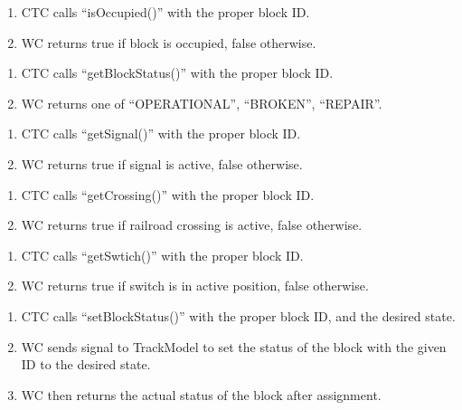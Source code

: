 \documentclass{scrreprt}
\begin{document}
    \begin{enumerate}
        \item CTC calls ``isOccupied()'' with the proper block ID.
        \item WC returns true if block is occupied, false otherwise.
    \end{enumerate}

    \begin{enumerate}
        \item CTC calls ``getBlockStatus()'' with the proper block ID.
        \item WC returns one of ``OPERATIONAL'', ``BROKEN'', ``REPAIR''.
    \end{enumerate}

    \begin{enumerate}
        \item CTC calls ``getSignal()'' with the proper block ID.
        \item WC returns true if signal is active, false otherwise.
    \end{enumerate}

    \begin{enumerate}
        \item CTC calls ``getCrossing()'' with the proper block ID.
        \item WC returns true if railroad crossing is active, false otherwise.
    \end{enumerate}

    \begin{enumerate}
        \item CTC calls ``getSwtich()'' with the proper block ID.
        \item WC returns true if switch is in active position, false otherwise.
    \end{enumerate}

    \begin{enumerate}
        \item CTC calls ``setBlockStatus()'' with the proper block ID, and the desired state.
        \item WC sends signal to TrackModel to set the status of the block with the given ID to the desired state.
        \item WC then returns the actual status of the block after assignment.
    \end{enumerate}
\end{document}
